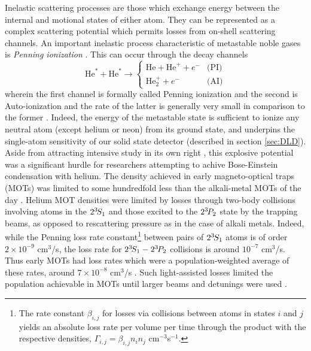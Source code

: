 	Inelastic scattering processes are those which exchange energy between the internal and motional states of either atom.
	They can be represented as a complex scattering potential \cite{Leo01} which permits losses from on-shell scattering channels.
	An important inelastic process characteristic of metastable noble gases is \emph{Penning ionization} \cite{VassenReview}.
	 This can occur through the decay channels
	\begin{equation}
		\textrm{He}^*+\textrm{He}^*\rightarrow 
		\begin{cases}
			\textrm{He}+ \textrm{He}^+ + e^-&\textrm{(PI)}\\
			\textrm{He}_{2}^{+} + e^-&\textrm{(AI)}
		\end{cases}
	\end{equation}
	wherein the first channel is formally called Penning ionization and the second is  Auto-ionization and the rate of the latter is generally very small in comparison to the former \cite{Muller91}.
	Indeed, the energy of the metastable state is sufficient to ionize any neutral atom (except helium or neon) from its ground state, and underpins the single-atom sensitivity of our solid state detector (described in section \ref{sec:DLD}).
	Aside from attracting intensive study in its own right \cite{Partridge10,Stas06,McNamara07}, this explosive potential was a significant hurdle for researchers attempting to achive Bose-Einstein condensation with helium.
	The density achieved in early magneto-optical traps (MOTs) was limited to some hundredfold less than the alkali-metal MOTs of the day \cite{Bardou92,Kumukura92,Mastwijk98}.
	Helium MOT densities were limited by losses through two-body collisions involving atoms in the $2^{3\!}S_1$ and those excited to the $2^{3\!} P_2$ state by the trapping beams, as opposed to rescattering pressure as in the case of alkali metals.
	Indeed, while the Penning loss rate constant\footnote{The rate constant $\beta_{i,j}$ for losses via collisions between atoms in states $i$ and $j$ yields an absolute loss rate per volume per time through the product with the respective densities, $\Gamma_{i,j} = \beta_{i,j}n_i n_j$ cm$^{-3}$s$^{-1}$.} between pairs of $2^{3\!}S_1$ atoms is of order $2\times10^{-9}$ cm$^3$/s, the loss rate for $2^{3\!}S_1-2^{3\!} P_2$  collisions is around $10^{-7}$ cm$^3$/s.
	Thus early MOTs had loss rates which were a population-weighted average of these rates, around $7\times10^{-8}$ cm$^3$/s \cite{Weiner99}.
	Such light-assisted losses  limited the population achievable in MOTs until larger beams and detunings were used \cite{Tol99}.

